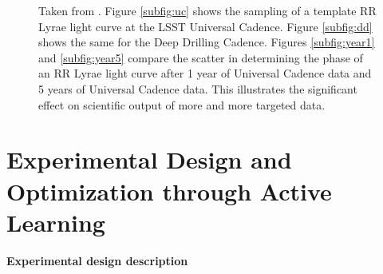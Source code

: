 \documentclass[useAMS,usenatbib,tightenlines,11pt,preprint]{aastex}
\begin{document}
\begin{figure}
{{\label{subfig:year1}
}
}
\caption{
Taken from \cite{rrlyrae}.  Figure \ref{subfig:uc} shows the sampling of
a template RR Lyrae light curve at the LSST Universal Cadence.
Figure \ref{subfig:dd} shows the same for the 
Deep Drilling Cadence.  Figures \ref{subfig:year1} and \ref{subfig:year5} compare the scatter
in determining the phase of an RR Lyrae light curve after 1 year of Universal Cadence
data and 5 years of Universal Cadence data.  This illustrates the significant effect
on scientific output of more and more targeted data.
}
\label{fig:RRLyrae}
\end{figure}





\section{Experimental Design and Optimization through Active
  Learning}
 
{\bf Experimental design description}
\end{document}

